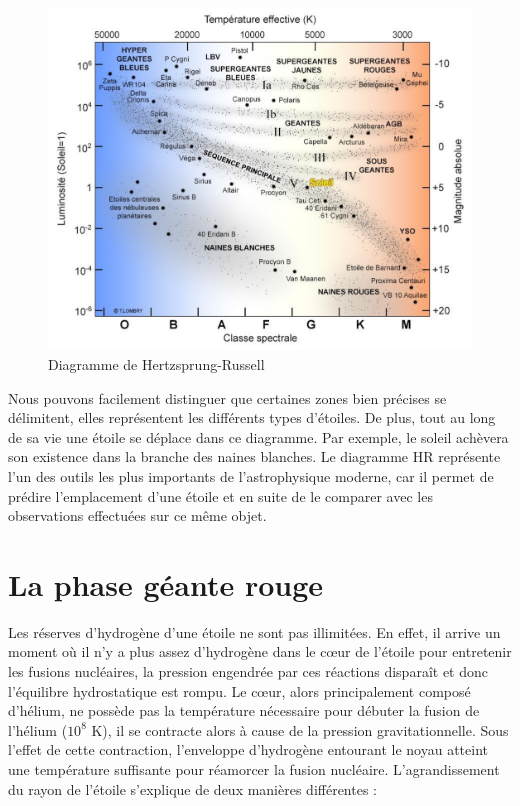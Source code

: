\begin{figure}[H]\vspace{1cm}
	\centering
	\includegraphics[scale=0.4]{images/hr-diagram}
	\caption[Diagramme de Hertzsprung-Russell\newline\url{http://www.astrosurf.com/luxorion/vie-etoiles2.html}]{Diagramme de Hertzsprung-Russell}
	\label{Fig. 2.2}
\end{figure}\bigskip

Nous pouvons facilement distinguer que certaines zones bien précises se délimitent, elles représentent les différents types d’étoiles. De plus, tout au long de sa vie une étoile se déplace dans ce diagramme. Par exemple, le soleil achèvera son existence dans la branche des naines blanches. Le diagramme HR représente l’un des outils les plus importants de l’astrophysique moderne, car il permet de prédire l’emplacement d’une étoile et en suite de le comparer avec les observations effectuées sur ce même objet.\bigskip

\section{La phase géante rouge}\label{2.2}

Les réserves d’hydrogène d’une étoile ne sont pas illimitées. En effet, il arrive un moment où il n’y a plus assez d’hydrogène dans le cœur de l’étoile pour entretenir les fusions nucléaires, la pression engendrée par ces réactions disparaît et donc l’équilibre hydrostatique est rompu. Le cœur, alors principalement composé d’hélium, ne possède pas la température nécessaire pour débuter la fusion de l’hélium ($10^{8}$ K), il se contracte alors à cause de la pression gravitationnelle. Sous l’effet de cette contraction, l’enveloppe d’hydrogène entourant le noyau atteint une température suffisante pour réamorcer la fusion nucléaire. L’agrandissement du rayon de l’étoile s’explique de deux manières différentes :

